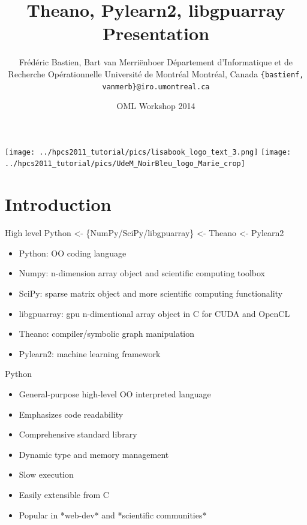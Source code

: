 \documentclass[utf8x,xcolor=pdftex,dvipsnames,table]{beamer}
\title{Theano, Pylearn2, libgpuarray Presentation}
\author{%
\footnotesize
Frédéric Bastien\superscript{a}, Bart van Merriënboer\superscript{a} \newline
\superscript{a}Département d'Informatique et de Recherche Opérationnelle \newline
Université de Montréal \newline
Montréal, Canada \newline
\texttt{\{bastienf, vanmerb\}@iro.umontreal.ca} \newline \newline
}
\date{OML Workshop 2014}
\begin{document}
\begin{frame}[plain]
 \titlepage
 \vspace{-5em}
 \texttt{[image: ../hpcs2011\_tutorial/pics/lisabook\_logo\_text\_3.png]}
 \hfill
 \texttt{[image: ../hpcs2011\_tutorial/pics/UdeM\_NoirBleu\_logo\_Marie\_crop]}
\end{frame}

\section{Introduction}
\begin{frame}{High level}\setcounter{page}{1}
  Python <- \{NumPy/SciPy/libgpuarray\} <- Theano <- Pylearn2
  \begin{itemize}
  \item Python: OO coding language
  \item Numpy: n-dimension array object and scientific computing toolbox
  \item SciPy: sparse matrix object and more scientific computing functionality
  \item libgpuarray: gpu n-dimentional array object in C for CUDA and OpenCL
  \item Theano: compiler/symbolic graph manipulation
  \item Pylearn2: machine learning framework
  \end{itemize}
\end{frame}

\begin{frame}{Python}
  \begin{itemize}
  \item General-purpose high-level OO interpreted language
  \item Emphasizes code readability
  \item Comprehensive standard library
  \item Dynamic type and memory management
  \item Slow execution
  \item Easily extensible from C
  \item Popular in *web-dev* and *scientific communities*
  \end{itemize}
\end{frame}
\end{document}

